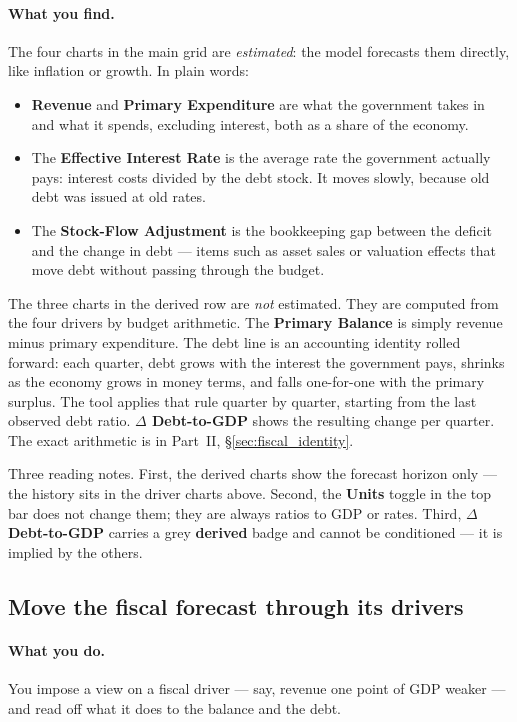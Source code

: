\documentclass[11pt]{article}
\theoremstyle{definition}
\theoremstyle{remark}
\begin{document}
\paragraph{What you find.} The four charts in the main grid are \emph{estimated}: the model
forecasts them directly, like inflation or growth. In plain words:
\begin{itemize}
  \item \textbf{Revenue} and \textbf{Primary Expenditure} are what the government takes in and
    what it spends, excluding interest, both as a share of the economy.
  \item The \textbf{Effective Interest Rate} is the average rate the government actually pays:
    interest costs divided by the debt stock. It moves slowly, because old debt was issued at
    old rates.
  \item The \textbf{Stock-Flow Adjustment} is the bookkeeping gap between the deficit and the
    change in debt --- items such as asset sales or valuation effects that move debt without
    passing through the budget.
\end{itemize}
The three charts in the derived row are \emph{not} estimated. They are computed from the four
drivers by budget arithmetic. The \textbf{Primary Balance} is simply revenue minus primary
expenditure. The debt line is an accounting identity rolled forward: each quarter, debt grows
with the interest the government pays, shrinks as the economy grows in money terms, and falls
one-for-one with the primary surplus. The tool applies that rule quarter by quarter, starting
from the last observed debt ratio. \textbf{$\Delta$ Debt-to-GDP} shows the resulting change per
quarter. The exact arithmetic is in Part~II, \S\ref{sec:fiscal_identity}.

Three reading notes. First, the derived charts show the forecast horizon only --- the history
sits in the driver charts above. Second, the \textbf{Units} toggle in the top bar does not
change them; they are always ratios to GDP or rates. Third, \textbf{$\Delta$ Debt-to-GDP}
carries a grey \textbf{derived} badge and cannot be conditioned --- it is implied by the others.

\subsection{Move the fiscal forecast through its drivers}

\paragraph{What you do.} You impose a view on a fiscal driver --- say, revenue one point of GDP
weaker --- and read off what it does to the balance and the debt.
\end{document}
